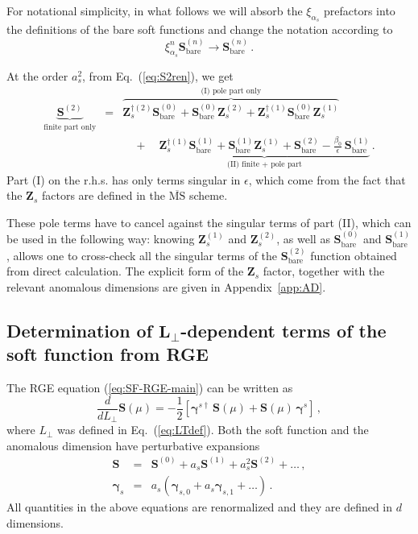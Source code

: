 \documentclass[a4paper,11pt]{article}
\newcommand{\as}{{\alpha_s}}
\newcommand{\bfS}{\bm{S}}
\newcommand{\bfZ}{\bm{Z}}
\newcommand{\bare}{\text{bare}}
\newcommand{\msbar}{\ensuremath{\overline{\text{MS}}}\xspace}
\newcommand{\LT}{L_\perp}
\newcommand{\bfgamma}{\bm{\gamma}}
\numberwithin{equation}{section}
\begin{document}
For notational simplicity, in what follows we will absorb the $\xi_\as$
prefactors into the definitions of the bare soft functions and change the
notation according to
%
\begin{equation}
  \xi_\as^n \bfS^{(n)}_\bare \to
  \bfS^{(n)}_\bare\,.
\end{equation}
%

At the order $a_s^2$, from Eq.~(\ref{eq:S2ren}), we get
%
\begin{eqnarray}
  \underbrace{\bfS^{(2)}}_{\text{finite part only}}   
  &  =  &
  \overbrace{\bfZ^{\dagger (2)}_s \bfS^{(0)}_\bare  + 
   \bfS^{(0)}_\bare \bfZ^{(2)}_s  +
   \bfZ^{\dagger (1)}_s \bfS^{(0)}_\bare \bfZ^{(1)}_s}^{\text{(I) pole part only}} 
  \nonumber \\
  & &
  \quad +  \quad 
  \underbrace{\bfZ^{\dagger (1)}_s \bfS^{(1)}_\bare  + 
  \bfS^{(1)}_\bare \bfZ^{(1)}_s  +
  \bfS^{(2)}_\bare
 -\frac{\beta_0}{\epsilon}\, \bfS^{(1)}_\bare
  }_{\text{(II) finite + pole part}} \,.
  \label{eq:renS2}
\end{eqnarray}
%
Part (I) on the r.h.s. has only terms singular in $\epsilon$, which come
from the fact that the $\bfZ_s$ factors are defined in the \msbar scheme. 

These pole terms have to cancel against the singular terms of part (II),
which can be used in the following way:
%
knowing $\bfZ_s^{(1)}$ and $\bfZ_s^{(2)}$, as well as $\bfS^{(0)}_\bare$ and
$\bfS^{(1)}_\bare$, allows one to cross-check all the singular terms of
the $\bfS^{(2)}_\bare$ function obtained from direct calculation.
%
The explicit form of the $\bfZ_s$ factor, together with the relevant anomalous
dimensions are given in Appendix~\ref{app:AD}.

\subsection[Determination of $L_\perp$-dependent terms of the soft
function from RGE]{Determination of $\mathbold{L_\perp}$-dependent terms of the soft function from RGE}

\label{sec:RGevolution}


The RGE equation (\ref{eq:SF-RGE-main}) can be written as
%
\begin{equation}
  \frac{d}{d L_\perp} \bfS(\mu) =
  - \frac{1}{2} \left[
  \bfgamma^{s \dagger}\,\bfS(\mu)  
  + \bfS(\mu)\, \bfgamma^{s}
  \right]\,,
  \label{eq:SF-RGE-Lp}
\end{equation}
%
where $\LT$ was defined in Eq.~(\ref{eq:LTdef}).
%
Both the soft function and the anomalous dimension have perturbative expansions
%
\begin{eqnarray}
  \bfS  & = &
  \bfS^{(0)} + a_s \bfS^{(1)} + a_s^2 \bfS^{(2)} + \ldots\,,
  \label{eq:Sren-exp}
  \\
  \bfgamma_{s} & = &
  a_s \left(\bfgamma_{s,0} + a_s \bfgamma_{s,1}+ \ldots\right)\,.
  \label{eq:gammas-exp}
\end{eqnarray}
%
All quantities in the above equations are renormalized and they are defined in
$d$ dimensions.
 
\end{document}
